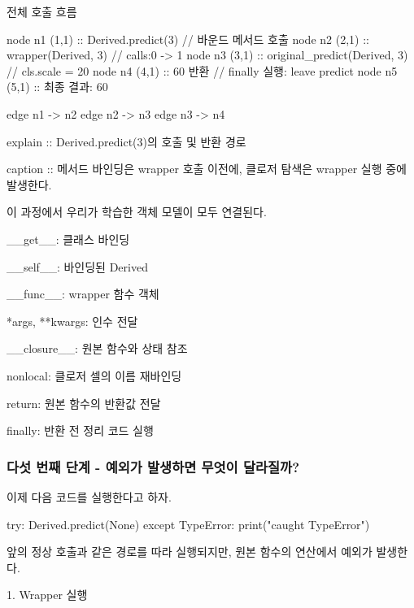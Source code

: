 \begin{dhknote}
\begin{dhksmry}[centered]
전체 호출 흐름
\end{dhksmry}
\end{dhknote}

\begin{dhkgraph}[uniform]
node n1 (1,1) :: Derived.predict(3) // 바운드 메서드 호출
node n2 (2,1) :: wrapper(Derived, 3) // calls:0 -> 1
node n3 (3,1) :: original_predict(Derived, 3) // cls.scale = 20
node n4 (4,1) :: 60 반환 // finally 실행: leave predict
node n5 (5,1) :: 최종 결과: 60

edge n1 -> n2
edge n2 -> n3
edge n3 -> n4

explain :: Derived.predict(3)의 호출 및 반환 경로

caption :: 메서드 바인딩은 wrapper 호출 이전에, 클로저 탐색은 wrapper 실행 중에 발생한다.
\end{dhkgraph}

이 과정에서 우리가 학습한 객체 모델이 모두 연결된다.

\begin{dhksmry}
    __get__: 클래스 바인딩

    __self__: 바인딩된 Derived

    __func__: wrapper 함수 객체

    *args, **kwargs: 인수 전달

    __closure__: 원본 함수와 상태 참조

    nonlocal: 클로저 셀의 이름 재바인딩

    return: 원본 함수의 반환값 전달

    finally: 반환 전 정리 코드 실행
\end{dhksmry}

\subsubsection{다섯 번째 단계 - 예외가 발생하면 무엇이 달라질까?}

이제 다음 코드를 실행한다고 하자.

\begin{dhkcode}
try:
    Derived.predict(None)
except TypeError:
    print("caught TypeError")
\end{dhkcode}

앞의 정상 호출과 같은 경로를 따라 실행되지만, 원본 함수의 연산에서 예외가 발생한다.

\begin{dhknote}
\begin{dhksmry}[centered]
1. Wrapper 실행
\end{dhksmry}
\end{dhknote}

